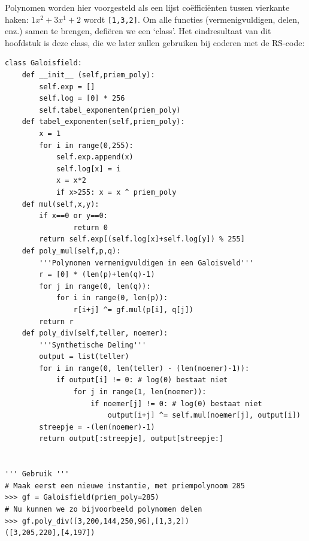 \documentclass[a4paper]{article}
\begin{document}
Polynomen worden hier voorgesteld als een lijst coëfficiënten tussen vierkante haken: $1x^2 + 3x^1 + 2$ wordt \texttt{[1,3,2]}. Om alle functies (vermenigvuldigen, delen, enz.) samen te brengen, defiëren we een `class'. Het eindresultaat van dit hoofdstuk is deze class, die we later zullen gebruiken bij coderen met de RS-code:
\begin{verbatim}
class Galoisfield:
    def __init__ (self,priem_poly):
        self.exp = []
        self.log = [0] * 256
        self.tabel_exponenten(priem_poly)
    def tabel_exponenten(self,priem_poly):
        x = 1
        for i in range(0,255):
            self.exp.append(x)
            self.log[x] = i
            x = x*2
            if x>255: x = x ^ priem_poly
    def mul(self,x,y):
        if x==0 or y==0:
                return 0
        return self.exp[(self.log[x]+self.log[y]) % 255]
    def poly_mul(self,p,q):
        '''Polynomen vermenigvuldigen in een Galoisveld'''
        r = [0] * (len(p)+len(q)-1)
        for j in range(0, len(q)):
            for i in range(0, len(p)):
                r[i+j] ^= gf.mul(p[i], q[j])
        return r
    def poly_div(self,teller, noemer):
        '''Synthetische Deling'''
        output = list(teller)
        for i in range(0, len(teller) - (len(noemer)-1)):
            if output[i] != 0: # log(0) bestaat niet
                for j in range(1, len(noemer)):
                    if noemer[j] != 0: # log(0) bestaat niet
                        output[i+j] ^= self.mul(noemer[j], output[i])
        streepje = -(len(noemer)-1)
        return output[:streepje], output[streepje:]

        
''' Gebruik '''
# Maak eerst een nieuwe instantie, met priempolynoom 285
>>> gf = Galoisfield(priem_poly=285)
# Nu kunnen we zo bijvoorbeeld polynomen delen
>>> gf.poly_div([3,200,144,250,96],[1,3,2])
([3,205,220],[4,197])
\end{verbatim}
\end{document}
